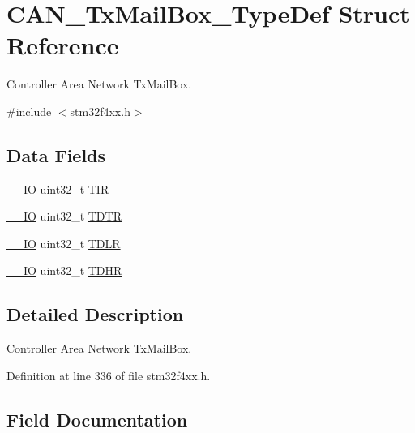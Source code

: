 \hypertarget{struct_c_a_n___tx_mail_box___type_def}{}\section{C\+A\+N\+\_\+\+Tx\+Mail\+Box\+\_\+\+Type\+Def Struct Reference}
\label{struct_c_a_n___tx_mail_box___type_def}


Controller Area Network Tx\+Mail\+Box.  




{\ttfamily \#include $<$stm32f4xx.\+h$>$}

\subsection*{Data Fields}
\begin{DoxyCompactItemize}
\item 
\hyperlink{group___c_m_s_i_s__core__definitions_gaec43007d9998a0a0e01faede4133d6be}{\+\_\+\+\_\+\+IO} uint32\+\_\+t \hyperlink{struct_c_a_n___tx_mail_box___type_def_a6921aa1c578a7d17c6e0eb33a73b6630}{T\+IR}
\item 
\hyperlink{group___c_m_s_i_s__core__definitions_gaec43007d9998a0a0e01faede4133d6be}{\+\_\+\+\_\+\+IO} uint32\+\_\+t \hyperlink{struct_c_a_n___tx_mail_box___type_def_aed87bed042dd9523ce086119a3bab0ea}{T\+D\+TR}
\item 
\hyperlink{group___c_m_s_i_s__core__definitions_gaec43007d9998a0a0e01faede4133d6be}{\+\_\+\+\_\+\+IO} uint32\+\_\+t \hyperlink{struct_c_a_n___tx_mail_box___type_def_aded1359e1a32512910bff534d57ade68}{T\+D\+LR}
\item 
\hyperlink{group___c_m_s_i_s__core__definitions_gaec43007d9998a0a0e01faede4133d6be}{\+\_\+\+\_\+\+IO} uint32\+\_\+t \hyperlink{struct_c_a_n___tx_mail_box___type_def_a90f7c1cf22683459c632d6040366eddf}{T\+D\+HR}
\end{DoxyCompactItemize}


\subsection{Detailed Description}
Controller Area Network Tx\+Mail\+Box. 

Definition at line 336 of file stm32f4xx.\+h.



\subsection{Field Documentation}
\mbox{\label{struct_c_a_n___tx_mail_box___type_def_a90f7c1cf22683459c632d6040366eddf}} 
